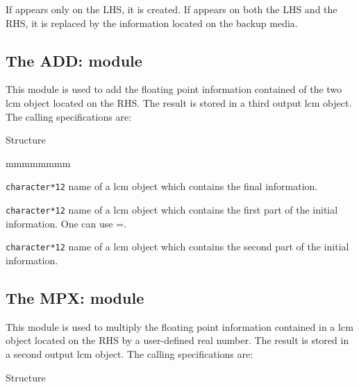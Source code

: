 If  appears only on the LHS, it is created. If 
appears on both the LHS and the RHS, it is replaced by the information located
on the backup media.

\clearpage

\subsection{The ADD: module}\label{sect:ADDData}

This module is used to add the floating point information contained of the two
{\sc lcm} object located on the RHS. The
result is stored in a third output {\sc lcm} object. The calling specifications
are:

\begin{DataStructure}{Structure }
 \moc{:=}     \moc{;}
\end{DataStructure}

\begin{ListeDeDescription}{mmmmmmmm}

\item[\dusa{NAME1}] {\tt character*12} name of a {\sc lcm} object which
contains the final information.

\item[\dusa{NAME2}] {\tt character*12} name of a {\sc lcm} object which
contains the first part of the initial information. One can use
=.


\item[\dusa{NAME3}] {\tt character*12} name of a {\sc lcm} object which
contains the second part of the initial information.

\end{ListeDeDescription}

\clearpage

\subsection{The MPX: module}\label{sect:MPXData}

This module is used to multiply the floating point information contained in a
{\sc lcm} object located on the RHS by a user-defined real number. The
result is stored in a second output {\sc lcm} object. The calling specifications
are:

\vskip -0.2cm

\begin{DataStructure}{Structure }
 \moc{:=}    \moc{::}  \moc{;}
\end{DataStructure}

